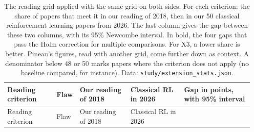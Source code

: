 \documentclass[11pt,a4paper]{article}
\begin{document}
\begin{longtable}[]{@{}
  >{\raggedright\arraybackslash}p{}
  >{\raggedright\arraybackslash}p{}
  >{\raggedleft\arraybackslash}p{}
  >{\raggedleft\arraybackslash}p{}
  >{\raggedleft\arraybackslash}p{}@{}}
\caption{The reading grid applied with the same grid on both sides. For
each criterion: the share of papers that meet it in our reading of 2018,
then in our 50 classical reinforcement learning papers from 2026. The
last column gives the gap between these two columns, with its 95\%
Newcombe interval. In bold, the four gaps that pass the Holm correction
for multiple comparisons. For X3, a lower share is better. Pineau's
figures, read with another grid, come further down as context. A
denominator below 48 or 50 marks papers where the criterion does not
apply (no baseline compared, for instance). Data:
\texttt{study/extension\_stats.json}.}\tabularnewline
\toprule\noalign{}
\begin{minipage}[b]{\linewidth}\raggedright
Reading criterion
\end{minipage} & \begin{minipage}[b]{\linewidth}\raggedright
Flaw
\end{minipage} & \begin{minipage}[b]{\linewidth}\raggedleft
Our reading of 2018
\end{minipage} & \begin{minipage}[b]{\linewidth}\raggedleft
Classical RL in 2026
\end{minipage} & \begin{minipage}[b]{\linewidth}\raggedleft
Gap in points, with 95\% interval
\end{minipage} \\
\midrule\noalign{}
\endfirsthead
\toprule\noalign{}
\begin{minipage}[b]{\linewidth}\raggedright
Reading criterion
\end{minipage} & \begin{minipage}[b]{\linewidth}\raggedright
Flaw
\end{minipage} & \begin{minipage}[b]{\linewidth}\raggedleft
Our reading of 2018
\end{minipage} & \begin{minipage}[b]{\linewidth}\raggedleft
Classical RL in 2026
\end{minipage} & \begin{minipage}[b]{\linewidth}\raggedleft

\end{minipage}
\end{longtable}
\end{document}
